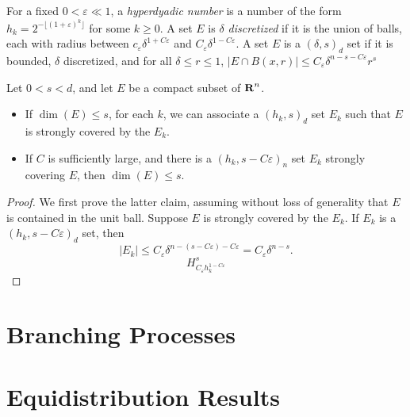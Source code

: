 For a fixed $0 < \varepsilon \ll 1$, a {\it hyperdyadic number} is a number of the form $h_k = 2^{-\lfloor (1 + \varepsilon)^k \rfloor}$ for some $k \geq 0$. A set $E$ is {\it $\delta$ discretized} if it is the union of balls, each with radius between $c_\varepsilon \delta^{1 + C\varepsilon}$ and $C_\varepsilon \delta^{1-C\varepsilon}$. A set $E$ is a $(\delta,s)_d$ set if it is bounded, $\delta$ discretized, and for all $\delta \leq r \leq 1$, $|E \cap B(x,r)| \leq C_\varepsilon \delta^{n-s-C\varepsilon} r^s$

\begin{lemma}
	Let $0 < s < d$, and let $E$ be a compact subset of $\operatorname{\mathbf{R}}^n$.
	\begin{itemize}
		\item If $\dim(E) \leq s$, for each $k$, we can associate a $(h_k,s)_d$ set $E_k$ such that $E$ is strongly covered by the $E_k$.

		\item If $C$ is sufficiently large, and there is a $(h_k, s - C\varepsilon)_n$ set $E_k$ strongly covering $E$, then $\dim(E) \leq s$.
	\end{itemize}
\end{lemma}
\begin{proof}
	We first prove the latter claim, assuming without loss of generality that $E$ is contained in the unit ball. Suppose $E$ is strongly covered by the $E_k$. If $E_k$ is a $(h_k,s - C\varepsilon)_d$ set, then
	\[ |E_k| \leq C_\varepsilon \delta^{n-(s-C\varepsilon)-C\varepsilon} = C_\varepsilon \delta^{n-s}. \]
	\[ H^s_{C_\varepsilon h_k^{1 - C\varepsilon}} \]
\end{proof}



\section{Branching Processes}









\section{Equidistribution Results}

